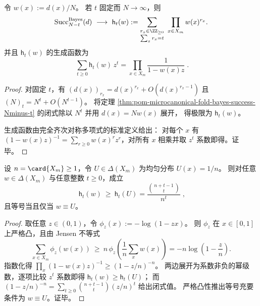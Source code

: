 \begin{theorem}\label{thm:pom-microcanonical-fold-bayes-success-thermo-limit}
令 \(w(x):=d(x)/N\)。
若 \(t\) 固定而 \(N\to\infty\)，则
\[
\mathrm{Succ}^{\mathrm{Bayes}}_{N-t}(d)\ \longrightarrow\ \mathsf{h}_t(w)
:=\sum_{\substack{r_x\in\ZZ_{\ge 0}\\ \sum_x r_x=t}}\ \prod_{x\in X_m} w(x)^{r_x}.
\]
并且 \(\mathsf{h}_t(w)\) 的生成函数为
\[
\boxed{\;
\sum_{t\ge 0}\mathsf{h}_t(w)\,z^t=\prod_{x\in X_m}\frac{1}{1-w(x)z}\; } .
\]
\end{theorem}
\begin{proof}
对固定 \(t\)，有
\(
(d(x))_{r_x}=d(x)^{r_x}+O(d(x)^{r_x-1})
\)
且 \((N)_t=N^t+O(N^{t-1})\)。
将定理 \ref{thm:pom-microcanonical-fold-bayes-success-Nminus-t} 的闭式除以 \(N^t\) 并用 \(d(x)=Nw(x)\) 展开，
得极限为 \(\mathsf{h}_t(w)\)。
\par
生成函数由完全齐次对称多项式的标准定义给出：
对每个 \(x\) 有 \((1-w(x)z)^{-1}=\sum_{r\ge 0}w(x)^r z^r\)，对所有 \(x\) 相乘并取 \(z^t\) 系数即得。证毕。
\end{proof}

\begin{theorem}\label{thm:pom-microcanonical-fold-ht-uniform-min}
设 \(n=\card{X_m}\ge 1\)，令 \(U\in\Delta(X_m)\) 为均匀分布 \(U(x)=1/n\)。
则对任意 \(w\in\Delta(X_m)\) 与任意整数 \(t\ge 0\)，成立
\[
\boxed{\;
\mathsf{h}_t(w)\ \ge\ \mathsf{h}_t(U)=\frac{\binom{n+t-1}{t}}{n^t}\; } ,
\]
且等号当且仅当 \(w\equiv U\)。
\end{theorem}
\begin{proof}
取任意 \(z\in(0,1)\)，令 \(\phi_z(x):=-\log(1-zx)\)。
则 \(\phi_z\) 在 \(x\in[0,1]\) 上严格凸，且由 Jensen 不等式
\[
\sum_{x\in X_m}\phi_z(w(x))
\ \ge\
n\,\phi_z\!\left(\frac{1}{n}\sum_x w(x)\right)
= -n\log\!\left(1-\frac{z}{n}\right).
\]
指数化得
\(
\prod_x(1-w(x)z)^{-1}\ge (1-z/n)^{-n}
\)。
两边展开为系数非负的幂级数，逐项比较 \(z^t\) 系数即得 \(\mathsf{h}_t(w)\ge \mathsf{h}_t(U)\)；
而
\(
(1-z/n)^{-n}=\sum_{t\ge 0}\binom{n+t-1}{t}(z/n)^t
\)
给出闭式值。
严格凸性推出等号充要条件为 \(w\equiv U\)。证毕。
\end{proof}

